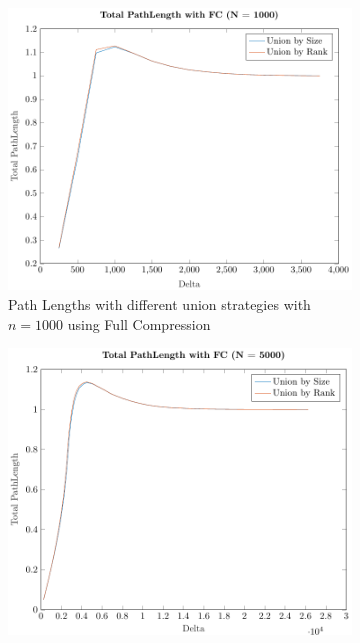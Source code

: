 \begin{figure}[ht]
    \centering
    \begin{subfigure}{0.32\textwidth}
        \centering
        \includegraphics[width=\textwidth]{../images/plotFCNonFull1000_PathLength.pdf}
        \caption{Path Lengths with different union strategies with $n = 1000$ using Full Compression}
    \end{subfigure}%
    \hfill
    \begin{subfigure}{0.32\textwidth}
        \centering
        \includegraphics[width=\textwidth]{../images/plotFCNonFull5000_PathLength.pdf}

\end{subfigure}
\end{figure}
